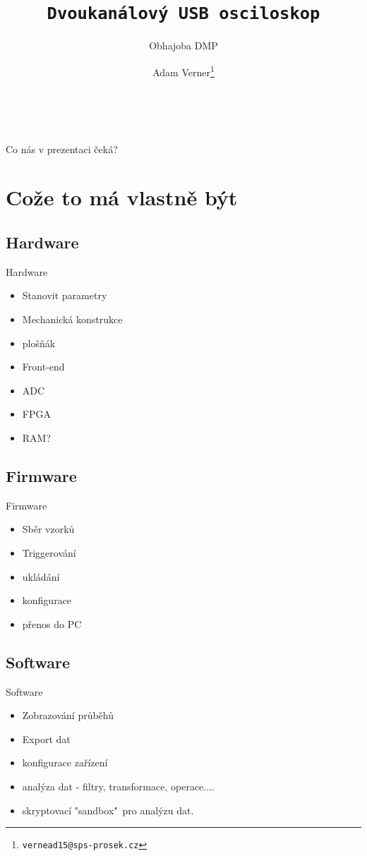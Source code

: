 \documentclass{beamer}
\title{\texttt{\LARGE Dvoukanálový USB osciloskop}}
\subtitle{ Obhajoba DMP }
\author{ Adam Verner\footnote{\texttt{vernead15@sps-prosek.cz}}}
\begin{document}
\begin{frame}
  \maketitle \\
\end{frame}

\begin{frame}{Co nás v prezentaci čeká?}
  \tableofcontents
\end{frame}

\section{Cože to má vlastně být}


	\subsection{Hardware}
	\begin{frame}{Hardware}
		\begin{itemize}
			\item Stanovit parametry
			\item Mechanická konstrukce
			\item plošňák
			\item Front-end
			\item ADC
			\item FPGA
			\item RAM?
		\end{itemize}
	\end{frame}
	
	\subsection{Firmware}
	\begin{frame}{Firmware}
		\begin{itemize}
			\item Sběr vzorků
			\item Triggerování
			\item ukládání
			\item konfigurace
			\item přenos do PC
		\end{itemize}
	\end{frame}
	
	\subsection{Software}
	\begin{frame}{Software}
		\begin{itemize}
			\item Zobrazování průběhů
			\item Export dat
			\item konfigurace zařízení
			\item analýza dat - filtry, transformace, operace....
			\item skryptovací "sandbox"\ pro analýzu dat.
		\end{itemize}
	\end{frame}
\end{document}
